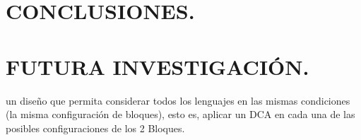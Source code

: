 \documentclass[11pt,a4paper]{article}
\begin{document}

\section{CONCLUSIONES.} %

\section{FUTURA INVESTIGACIÓN.} %
un diseño que permita considerar todos los lenguajes en las mismas condiciones (la misma configuración de bloques), esto es, aplicar un DCA en cada una de las posibles configuraciones de los 2 Bloques.


\newpage



\end{document}
